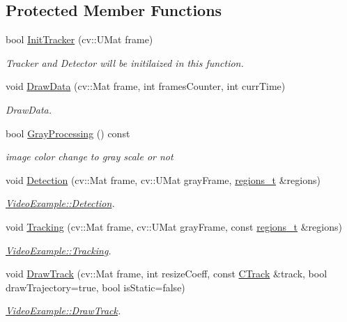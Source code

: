\subsection*{Protected Member Functions}
\begin{DoxyCompactItemize}
\item 
bool \mbox{\hyperlink{class_custom_s_s_d_mobile_net_example_a5d5c5184860ac247bd2f562d6678e5e2}{Init\+Tracker}} (cv\+::\+U\+Mat frame)
\begin{DoxyCompactList}\small\item\em Tracker and Detector will be initilaized in this function. \end{DoxyCompactList}\item 
void \mbox{\hyperlink{class_custom_s_s_d_mobile_net_example_a34a324a8390365c4e2c18ac049986df5}{Draw\+Data}} (cv\+::\+Mat frame, int frames\+Counter, int curr\+Time)
\begin{DoxyCompactList}\small\item\em Draw\+Data. \end{DoxyCompactList}\item 
bool \mbox{\hyperlink{class_custom_s_s_d_mobile_net_example_a4c3fe9ac68b5ef4f51d91a6322c5da02}{Gray\+Processing}} () const
\begin{DoxyCompactList}\small\item\em image color change to gray scale or not \end{DoxyCompactList}\item 
void \mbox{\hyperlink{class_video_example_a5ea4a212997371399b01aed1d59a80b8}{Detection}} (cv\+::\+Mat frame, cv\+::\+U\+Mat gray\+Frame, \mbox{\hyperlink{defines_8h_a01db0de56a20f4342820a093c5154536}{regions\+\_\+t}} \&regions)
\begin{DoxyCompactList}\small\item\em \mbox{\hyperlink{class_video_example_a5ea4a212997371399b01aed1d59a80b8}{Video\+Example\+::\+Detection}}. \end{DoxyCompactList}\item 
void \mbox{\hyperlink{class_video_example_af412482dcaad532d958dc31b362ee1c2}{Tracking}} (cv\+::\+Mat frame, cv\+::\+U\+Mat gray\+Frame, const \mbox{\hyperlink{defines_8h_a01db0de56a20f4342820a093c5154536}{regions\+\_\+t}} \&regions)
\begin{DoxyCompactList}\small\item\em \mbox{\hyperlink{class_video_example_af412482dcaad532d958dc31b362ee1c2}{Video\+Example\+::\+Tracking}}. \end{DoxyCompactList}\item 
void \mbox{\hyperlink{class_video_example_a84a040bc87b915c5ee18c5d11235f40c}{Draw\+Track}} (cv\+::\+Mat frame, int resize\+Coeff, const \mbox{\hyperlink{class_c_track}{C\+Track}} \&track, bool draw\+Trajectory=true, bool is\+Static=false)
\begin{DoxyCompactList}\small\item\em \mbox{\hyperlink{class_video_example_a84a040bc87b915c5ee18c5d11235f40c}{Video\+Example\+::\+Draw\+Track}}. \end{DoxyCompactList}\end{DoxyCompactItemize}
